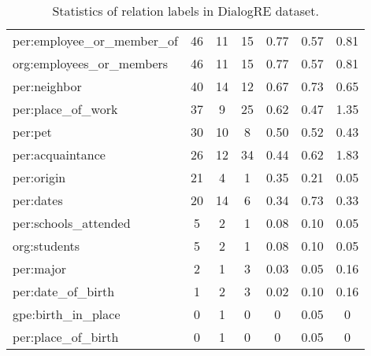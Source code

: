 \documentclass[11pt]{article}
\begin{document}
\begin{table*}[ht]
\begin{tabular}{l|ccc|ccc}
per:employee\_or\_member\_of & 46 & 11 & 15 & 0.77 & 0.57 & 0.81 \\
org:employees\_or\_members & 46 & 11 & 15 & 0.77 & 0.57 & 0.81 \\
per:neighbor & 40 & 14 & 12 & 0.67 & 0.73 & 0.65 \\
per:place\_of\_work & 37 & 9 & 25 & 0.62 & 0.47 & 1.35 \\
per:pet & 30 & 10 & 8 & 0.50 & 0.52 & 0.43 \\
per:acquaintance & 26 & 12 & 34 & 0.44 & 0.62 & 1.83 \\
per:origin & 21 & 4 & 1 & 0.35 & 0.21 & 0.05 \\
per:dates & 20 & 14 & 6 & 0.34 & 0.73 & 0.33 \\
per:schools\_attended & 5 & 2 & 1 & 0.08 & 0.10 & 0.05 \\
org:students & 5 & 2 & 1 & 0.08 & 0.10 & 0.05 \\
per:major & 2 & 1 & 3 & 0.03 & 0.05 & 0.16 \\
per:date\_of\_birth & 1 & 2 & 3 & 0.02 & 0.10 & 0.16 \\
gpe:birth\_in\_place & 0 & 1 & 0 & 0 & 0.05 & 0 \\
per:place\_of\_birth & 0 & 1 & 0 & 0 & 0.05 & 0 \\
\bottomrule
\end{tabular}
\caption{Statistics of relation labels in DialogRE dataset.}
\label{tab:relation-labels}
\end{table*}
\end{document}
